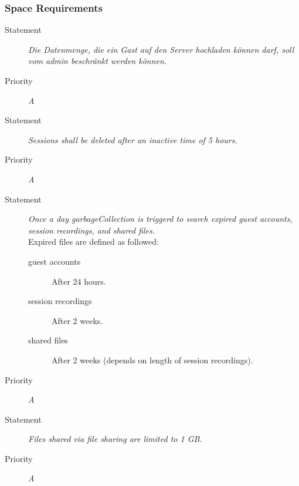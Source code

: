 \subsubsection{Space Requirements}
\NFR
\begin{description}
\item[Statement] \textit{Die Datenmenge, die ein Gast auf den Server hochladen können darf, soll vom \gls{admin} beschränkt werden können.}
\item[Priority] \textit{A}
\end{description}

\NFR
\begin{description}
\item[Statement] \textit{Sessions shall be deleted after an inactive time of 5
    hours.}
\item[Priority] \textit{A}
\end{description}

\NFR
\begin{description}
\item[Statement] \textit{Once a day \gls{garbageCollection} is triggerd to
    search expired guest accounts, session recordings, and shared files.}\\
  Expired files are defined as followed:
  \begin{description}
  \item[guest accounts] After 24 hours.
  \item[session recordings] After 2 weeks.
  \item[shared files] After 2 weeks (depends on length of session recordings).
  \end{description}
\item[Priority] \textit{A}
\end{description}

\NFR
\begin{description}
\item[Statement] \textit{Files shared via file sharing are limited to 1 GB.}
\item[Priority] \textit{A}
\end{description}